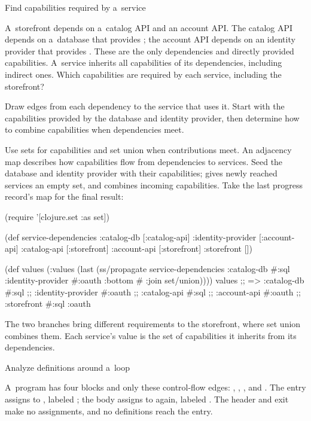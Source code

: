 {{{\secc Find capabilities required by a~service

 A~storefront depends on a~catalog API and an account
API. The catalog API depends on a~database that provides ; the
account API depends on an identity provider that provides .
These are the only dependencies and directly provided capabilities.
A~service inherits all capabilities of its dependencies, including
indirect ones.
Which capabilities are required by each service, including the storefront?

\smallskip
{} Draw edges from each dependency to the service that
uses it. Start with the capabilities provided by the database and identity
provider, then determine how to combine capabilities when dependencies meet.

\smallskip
{} Use sets for capabilities and set union when
contributions meet. An adjacency map describes how capabilities flow from
dependencies to services. Seed the database and identity provider with their
capabilities;  gives newly reached services an empty set,
and  combines incoming capabilities. Take the last
progress record's  map for the final result:

\begtt {}
(require '[clojure.set :as set])

(def service-dependencies
  {:catalog-db       [:catalog-api]
   :identity-provider [:account-api]
   :catalog-api      [:storefront]
   :account-api      [:storefront]
   :storefront       []})

(def values
  (:values
   (last (ss/propagate service-dependencies
                           {:catalog-db #{:sql}
                            :identity-provider #{:oauth}}
                           {:bottom #{}
                            :join set/union}))))
values
;; => {:catalog-db #{:sql}
;;     :identity-provider #{:oauth}
;;     :catalog-api #{:sql}
;;     :account-api #{:oauth}
;;     :storefront #{:sql :oauth}}
\endtt

The two branches bring different requirements to the storefront, where set
union combines them. Each service's value is the set of capabilities it
inherits from its dependencies.

\secc Analyze definitions around a~loop

 A~program has four blocks and only these
control-flow edges: , ,
, and . The entry assigns to
, labeled ; the body assigns to  again,
labeled . The header and exit make no assignments, and no
definitions reach the entry.

}}}
